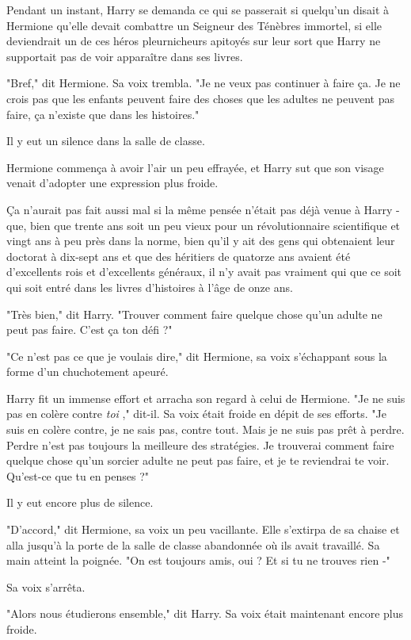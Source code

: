 Pendant un instant, Harry se demanda ce qui se passerait si quelqu'un disait à Hermione qu'elle devait combattre un Seigneur des Ténèbres immortel, si elle deviendrait un de ces héros pleurnicheurs apitoyés sur leur sort que Harry ne supportait pas de voir apparaître dans ses livres.

"Bref," dit Hermione. Sa voix trembla. "Je ne veux pas continuer à faire ça. Je ne crois pas que les enfants peuvent faire des choses que les adultes ne peuvent pas faire, ça n'existe que dans les histoires."

Il y eut un silence dans la salle de classe.

Hermione commença à avoir l'air un peu effrayée, et Harry sut que son visage venait d'adopter une expression plus froide.

Ça n'aurait pas fait aussi mal si la même pensée n'était pas déjà venue à Harry - que, bien que trente ans soit un peu vieux pour un révolutionnaire scientifique et vingt ans à peu près dans la norme, bien qu'il y ait des gens qui obtenaient leur doctorat à dix-sept ans et que des héritiers de quatorze ans avaient été d'excellents rois et d'excellents généraux, il n'y avait pas vraiment qui que ce soit qui soit entré dans les livres d'histoires à l'âge de onze ans.

"Très bien," dit Harry. "Trouver comment faire quelque chose qu'un adulte ne peut pas faire. C'est ça ton défi ?"

"Ce n'est pas ce que je voulais dire," dit Hermione, sa voix s'échappant sous la forme d'un chuchotement apeuré.

Harry fit un immense effort et arracha son regard à celui de Hermione. "Je ne suis pas en colère contre \emph{toi} ," dit-il. Sa voix était froide en dépit de ses efforts. "Je suis en colère contre, je ne sais pas, contre tout. Mais je ne suis pas prêt à perdre. Perdre n'est pas toujours la meilleure des stratégies. Je trouverai comment faire quelque chose qu'un sorcier adulte ne peut pas faire, et je te reviendrai te voir. Qu'est-ce que tu en penses ?"

Il y eut encore plus de silence.

"D'accord," dit Hermione, sa voix un peu vacillante. Elle s'extirpa de sa chaise et alla jusqu'à la porte de la salle de classe abandonnée où ils avait travaillé. Sa main atteint la poignée. "On est toujours amis, oui ? Et si tu ne trouves rien -"

Sa voix s'arrêta.

"Alors nous étudierons ensemble," dit Harry. Sa voix était maintenant encore plus froide.

